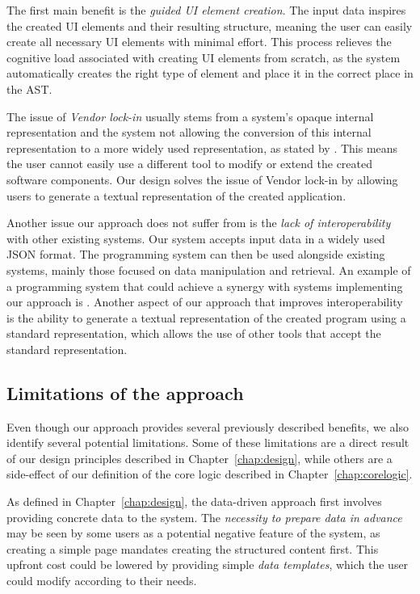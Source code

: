 The first main benefit is the \emph{guided UI element creation}.
The input data inspires the created UI elements and their resulting structure, meaning the user can easily create all necessary UI elements with minimal effort.
This process relieves the cognitive load associated with creating UI elements from scratch, as the system automatically creates the right type
of element and place it in the correct place in the AST.

The issue of \emph{Vendor lock-in} usually stems from a system's opaque internal representation and the system not allowing the conversion of this internal representation to a more widely used representation, as stated by \citet{Pinho_Aguiar_Amaral_2023}.
This means the user cannot easily use a different tool to modify or extend the created software components.
Our design solves the issue of Vendor lock-in by allowing users to generate a textual representation of the created application.

Another issue our approach does not suffer from is the \emph{lack of interoperability} with other existing systems.
Our system accepts input data in a widely used JSON format.
The programming system can then be used alongside existing systems, mainly those focused on data manipulation and retrieval.
An example of a programming system that could achieve a synergy with systems implementing our approach is \citet{graphql}.
Another aspect of our approach that improves interoperability is the ability to generate a textual representation of the created program using a standard representation, which allows the use of other tools that accept the standard representation.

\medskip
\subsection{Limitations of the approach}
Even though our approach provides several previously described benefits, we also identify several potential limitations.
Some of these limitations are a direct result of our design principles described in Chapter~\ref{chap:design}, while others are
a side-effect of our definition of the core logic described in Chapter~\ref{chap:corelogic}.

As defined in Chapter~\ref{chap:design}, the data-driven approach first involves providing concrete data to the system.
The \emph{necessity to prepare data in advance} may be seen by some users as a potential negative feature of the system, as creating a simple page mandates creating the structured content first.
This upfront cost could be lowered by providing simple \emph{data templates}, which the user could modify according to their needs.

